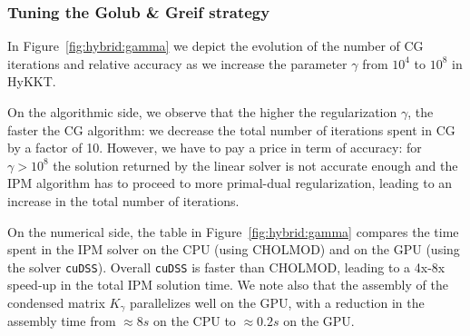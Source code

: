 \begin{table}[!ht]
  \centering
  \caption{Comparing the performance of cuDSS with CHOLMOD.
    The matrix $K_\gamma$ is symmetric positive definite, with
    a size $n = 674,562$. The matrix is extremely sparse, with only $7,342,680$ non-zero entries ($0.002$\%).
    \label{tab:linsol:time}
    (A100 GPU)
  }
\end{table}

\subsubsection{Tuning the Golub \& Greif strategy}
\label{sec:num:tuninghykkt}
In Figure~\ref{fig:hybrid:gamma} we depict the evolution of the number
of CG iterations and relative accuracy as we increase the parameter $\gamma$
from $10^4$ to $10^8$ in HyKKT.

On the algorithmic side, we observe that the higher the regularization $\gamma$,
the faster the CG algorithm: we decrease the total number of iterations
spent in CG by a factor of 10. However, we have to pay a price in term
of accuracy: for $\gamma > 10^8$ the solution returned by the linear solver
is not accurate enough and the IPM algorithm has to proceed to more
primal-dual regularization, leading to an increase in the total number of iterations.

On the numerical side, the table in Figure~\ref{fig:hybrid:gamma} compares
the time spent in the IPM solver on the CPU (using CHOLMOD) and on the GPU
(using the solver {\tt cuDSS}). Overall {\tt cuDSS} is
faster than CHOLMOD, leading to a 4x-8x speed-up in the total IPM solution time.
We note also that the assembly of the condensed matrix $K_\gamma$ parallelizes well
on the GPU, with a reduction in the assembly time from $\approx 8s$ on the CPU to $\approx 0.2s$ on the GPU.

